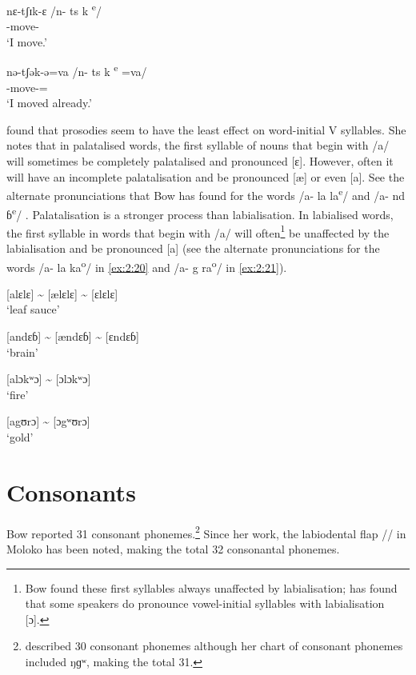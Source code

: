 \ea \label{ex:2:16}
\gll nɛ{}-tʃɪk-ɛ  {\hspace{25pt}}  /n-   ts k \textsuperscript{e}/\\
      {\oneS}-move-{\CL}\\
\glt  ‘I move.’      
\z

\ea \label{ex:2:17}
\gll nə-tʃək-ə=va    {\hspace{5pt}} \textup{/n-   ts k \textsuperscript{e}   =va/}\\
      {\oneS}-move-{\CL}={\PRF}\\
\glt  ‘I moved already.’
\z

  \citet{Bow1997c} found that prosodies seem to have the least effect on word-initial V syllables. She notes that in palatalised words, the first syllable of nouns that begin with /a/ will sometimes be completely palatalised and pronounced  [ɛ]. However, often it will have an incomplete palatalisation and be pronounced [æ] or even [a]. See the alternate pronunciations that Bow has found for the words /a- la la\textsuperscript{e}/  and /a- nd ɓ\textsuperscript{e}/ . Palatalisation is a stronger process than labialisation. In labialised words, the first syllable in words that begin with /a/ will often\footnote{Bow found these first syllables always unaffected by labialisation; \citet{Friesen2001} has found that some speakers do pronounce vowel-initial syllables with labialisation [ɔ].} be unaffected by the labialisation and be pronounced [a] (see the alternate pronunciations for the words /a- la ka\textsuperscript{o}/ in \ref{ex:2:20} and /a- g ra\textsuperscript{o}/ in \ref{ex:2:21}). 

\ea \label{ex:2:18}
\textup{[alɛlɛ] {\textasciitilde} [ælɛlɛ] {\textasciitilde} [ɛlɛlɛ]  }\\
\glt  ‘leaf sauce’        
\z

\ea \label{ex:2:19}
\textup{[andɛɓ] {\textasciitilde} [ændɛɓ] {\textasciitilde} [ɛndɛɓ]}\\
\glt  ‘brain’
\z

\ea \label{ex:2:20}
 \textup{[alɔkʷɔ}] {\textasciitilde} [ɔlɔkʷɔ] \\
\glt  ‘fire’        
\z

\ea \label{ex:2:21}
\textup{[agʊrɔ] {\textasciitilde} [ɔgʷʊrɔ]}\\
\glt  ‘gold’
\z

\section{Consonants}\label{sec:2.2}
\hypertarget{RefHeading1210441525720847}{}
Bow reported 31 consonant phonemes{.}\footnote{\citet{Bow1997c} described 30 consonant phonemes although her chart of consonant phonemes included ŋɡʷ, making the total 31.} Since her work, the labiodental flap /\dentalflap / in Moloko has been noted, making the total 32 consonantal phonemes.  

